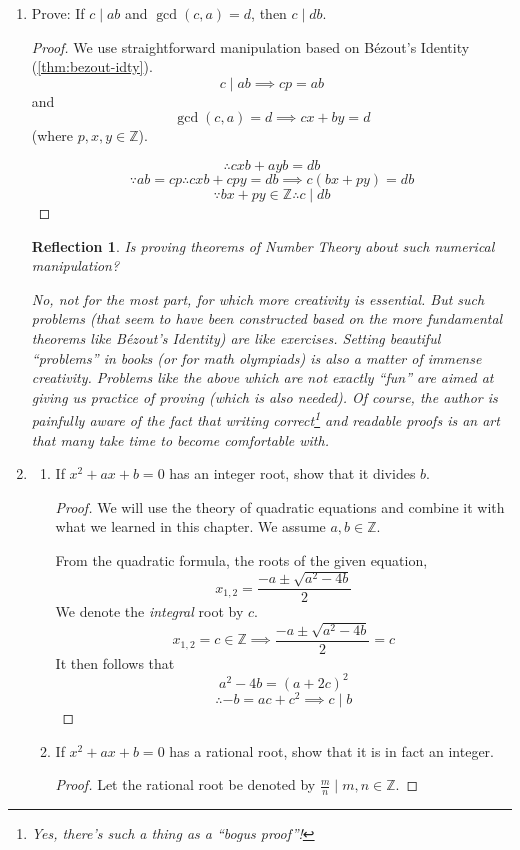 \documentclass[english,notitlepage,smartquotes]{hgbreport}
\theoremstyle{definition}
\theoremstyle{remark}
\theoremstyle{plain}
\newtheorem{reflection}{Reflection}
\begin{document}
\begin{enumerate}[label=\textbf{\arabic*}.]
\item Prove: If $c\mid ab$ and $\gcd(c,a)=d$, then $c\mid db$.


\begin{proof}
We use straightforward manipulation based on B\'ezout's Identity (\ref{thm:bezout-idty}).
$$
c\mid ab\implies cp=ab
$$
and
$$
\gcd(c,a)=d\implies cx+by=d
$$
(where $p,x,y\in\mathbb{Z}$).

$$
\therefore cxb+ayb=db
$$
$$
\because ab=cp \therefore cxb+cpy=db\implies c(bx+py)=db
$$
$$
\because bx+py\in\mathbb{Z}\therefore c\mid db
$$
\end{proof}
\begin{reflection}
Is proving theorems of Number Theory about such numerical manipulation?

No, not for the most part, for which more creativity is essential. But such problems (that seem to have been constructed based on the more fundamental theorems like B\'ezout's Identity) are like exercises. Setting beautiful ``problems'' in books (or for math olympiads) is also a matter of immense creativity. Problems like the above which are not exactly ``fun'' are aimed at giving us practice of proving (which is also needed). Of course, the author is painfully aware of the fact that writing correct\footnote{Yes, there's such a thing as a ``bogus proof''!} and readable proofs is an art that many take time to become comfortable with.
\end{reflection}

\item
\begin{enumerate}
\item If $x^2+ax+b=0$ has an integer root, show that it divides $b$.
\label{pr:115a}
\begin{proof}

We will use the theory of quadratic equations and combine it with what we learned in this chapter. We assume $a,b\in\mathbb{Z}$.

From the quadratic formula, the roots of the given equation,
$$
x_{1,2}=\frac{-a\pm\sqrt{a^2-4b}}{2}
$$
We denote the \emph{integral} root by $c$.
$$
x_{1,2}=c\in\mathbb{Z}\implies \frac{-a\pm\sqrt{a^2-4b}}{2}=c
$$
It then follows that
$$
a^2-4b=(a+2c)^2
$$
$$
\therefore -b=ac+c^2\implies c\mid b
$$
\end{proof}
\item If $x^2+ax+b=0$ has a rational root, show that it is in fact an integer. 
\label{pr:115b}
\begin{proof}
Let the rational root be denoted by $\frac{m}{n}\mid m,n\in\mathbb{Z}$.


\end{proof}
\end{enumerate}
\end{enumerate}
\end{document}
